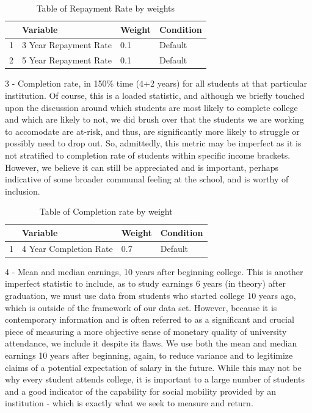 \documentclass{article}\usepackage[]{graphicx}\usepackage[]{color}
\begin{document}
\begin{table}[ht]
\centering
\begin{tabular}{rlll}
  \hline
 & Variable & Weight & Condition \\ 
  \hline
1 & 3 Year Repayment Rate & 0.1 & Default \\ 
  2 & 5 Year Repayment Rate & 0.1 & Default \\ 
   \hline
\end{tabular}
\caption{Table of Repayment Rate by weights} 
\end{table}



3 - Completion rate, in 150\% time (4+2 years) for all students at that particular institution. Of course, this is a loaded statistic, and although we briefly touched upon the discussion around which students are most likely to complete college and which are likely to not, we did brush over that the students we are working to accomodate are at-risk, and thus, are significantly more likely to struggle or possibly need to drop out. So, admittedly, this metric may be imperfect as it is not stratified to completion rate of students within specific income brackets. However, we believe it can still be appreciated and is important, perhaps indicative of some broader communal feeling at the school, and is worthy of inclusion. 

\begin{table}[ht]
\centering
\begin{tabular}{rlll}
  \hline
 & Variable & Weight & Condition \\ 
  \hline
1 & 4 Year Completion Rate & 0.7 & Default \\ 
   \hline
\end{tabular}
\caption{Table of Completion rate by weight} 
\end{table}


4 - Mean and median earnings, 10 years after beginning college. This is another imperfect statistic to include, as to study earnings 6 years (in theory) after graduation, we must use data from students who started college 10 years ago, which is outside of the framework of our data set. However, because it is contemporary information and is often referred to as a significant and crucial piece of measuring a more objective sense of monetary quality of university attendance, we include it despite its flaws. We use both the mean and median earnings 10 years after beginning, again, to reduce variance and to legitimize claims of a potential expectation of salary in the future. While this may not be why every student attends college, it is important to a large number of students and a good indicator of the capability for social mobility provided by an institution - which is exactly what we seek to measure and return.
\end{document}
